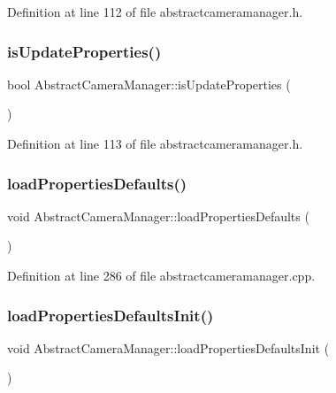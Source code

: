 Definition at line 112 of file abstractcameramanager.\+h.

\mbox{\label{class_abstract_camera_manager_aaa7c4f101bb59d9aa8fdc1ca4bfc25d8}} 
\subsubsection{\texorpdfstring{isUpdateProperties()}{isUpdateProperties()}}
{\footnotesize\ttfamily bool Abstract\+Camera\+Manager\+::is\+Update\+Properties (\begin{DoxyParamCaption}{ }\end{DoxyParamCaption})\hspace{0.3cm}{\ttfamily [inline]}}



Definition at line 113 of file abstractcameramanager.\+h.

\mbox{\label{class_abstract_camera_manager_a128aa1d8ba9757ccafd1923a66a3ee9a}} 
\subsubsection{\texorpdfstring{loadPropertiesDefaults()}{loadPropertiesDefaults()}}
{\footnotesize\ttfamily void Abstract\+Camera\+Manager\+::load\+Properties\+Defaults (\begin{DoxyParamCaption}{ }\end{DoxyParamCaption})}



Definition at line 286 of file abstractcameramanager.\+cpp.

\mbox{\label{class_abstract_camera_manager_a8de0c6eb036295d3bcf6d25c95ed4da2}} 
\subsubsection{\texorpdfstring{loadPropertiesDefaultsInit()}{loadPropertiesDefaultsInit()}}
{\footnotesize\ttfamily void Abstract\+Camera\+Manager\+::load\+Properties\+Defaults\+Init (\begin{DoxyParamCaption}{ }\end{DoxyParamCaption})}



